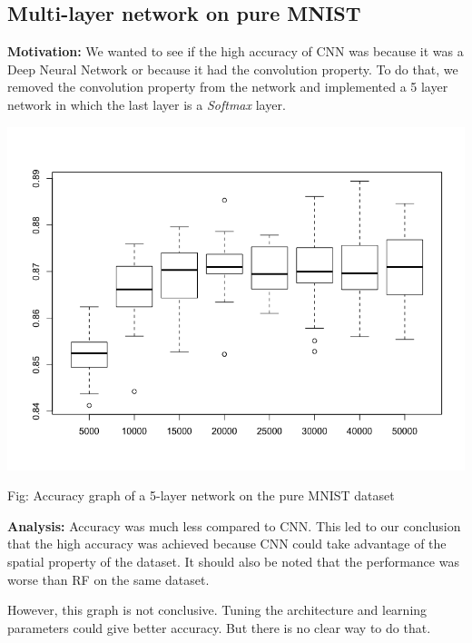 \documentclass{article}
\begin{document}
\subsection*{Multi-layer network on pure MNIST}
\textbf{Motivation:} We wanted to see if the high accuracy of CNN was because it was a Deep Neural Network or because it had the convolution property. To do that, we removed the convolution property from the network and implemented a 5 layer network in which the last layer is a \textit{Softmax} layer.
\begin{center}
	\includegraphics[scale=0.35]{Perceptron_MNIST_CNN}
\end{center}
\begin{center}
	Fig: Accuracy graph of a 5-layer network on the pure MNIST dataset
\end{center}

\textbf{Analysis:} Accuracy was much less compared to CNN. This led to our conclusion that the high accuracy was achieved because CNN could take advantage of the spatial property of the dataset. It should also be noted that the performance was worse than RF on the same dataset.

However, this graph is not conclusive. Tuning the architecture and learning parameters could give better accuracy. But there is no clear way to do that.
\end{document}
